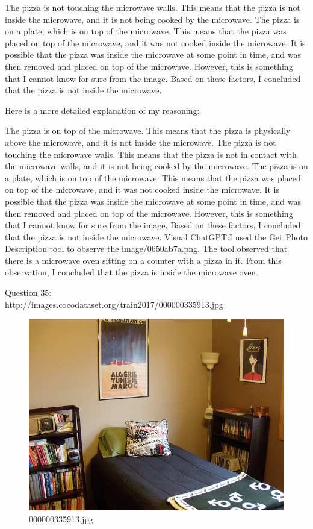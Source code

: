 \begin{enumerate}
        The pizza is not touching the microwave walls. This means that the pizza is not inside the microwave, and it is not being cooked by the microwave.
        The pizza is on a plate, which is on top of the microwave. This means that the pizza was placed on top of the microwave, and it was not cooked inside the microwave.
        It is possible that the pizza was inside the microwave at some point in time, and was then removed and placed on top of the microwave. However, this is something that I cannot know for sure from the image.
        Based on these factors, I concluded that the pizza is not inside the microwave.
        
        Here is a more detailed explanation of my reasoning:
        
        The pizza is on top of the microwave. This means that the pizza is physically above the microwave, and it is not inside the microwave.
        The pizza is not touching the microwave walls. This means that the pizza is not in contact with the microwave walls, and it is not being cooked by the microwave.
        The pizza is on a plate, which is on top of the microwave. This means that the pizza was placed on top of the microwave, and it was not cooked inside the microwave.
        It is possible that the pizza was inside the microwave at some point in time, and was then removed and placed on top of the microwave. However, this is something that I cannot know for sure from the image.
        Based on these factors, I concluded that the pizza is not inside the microwave.
        \subitem Visual ChatGPT:I used the Get Photo Description tool to observe the image/0650ab7a.png. The tool observed that there is a microwave oven sitting on a counter with a pizza in it. From this observation, I concluded that the pizza is inside the microwave oven.
    \end{enumerate}
    Question 35:\\http://images.cocodataset.org/train2017/000000335913.jpg
    \begin{figure}[h]
        \centering
        \includegraphics[width=0.8\linewidth]{../image set/easy/000000335913.jpg}
        \caption{000000335913.jpg}
    \end{figure}
